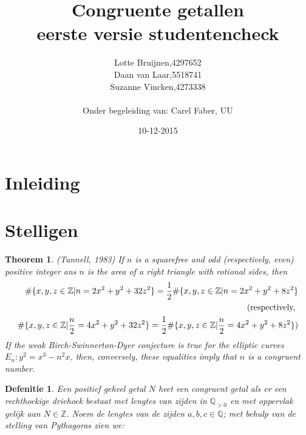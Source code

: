 \documentclass[12pt,reqno]{article}
\title{\textbf{Congruente getallen}\\
		\small{eerste versie studentencheck}}
\author{
	\begin{tabular}{ l l }
		Lotte Bruijnen, & 4297652 \\
		Daan van Laar, & 5518741 \\
		Suzanne Vincken, & 4273338
	\end{tabular}\\
	Onder begeleiding van: Carel Faber, UU
}
\date{10-12-2015}
\newcommand*{\ZZ}{\ensuremath{\mathbb{Z}}}
\newcommand*{\QQ}{\ensuremath{\mathbb{Q}}}
\begin{document}
	
	\maketitle
	\allowdisplaybreaks
	
	\section{Inleiding}
	
	\section{Stelligen}
	
	\newtheorem{Tunnell}{Theorem}
	\begin{Tunnell}
		 (Tunnell, 1983) If $n$ is a squarefree and odd (respectively, even) positive integer ans $n$ is the area of a right triangle with rotional sides, then
		\begin{align}
		\#\{x,y,z\in\ZZ|n=2x^2+y^2+32z^2\} = \frac{1}{2}\#\{x,y,z\in\ZZ|n=2x^2+y^2+8z^2\}\\
		\notag \text{(respectively, } \\
		\#\{x,y,z\in\ZZ|\frac{n}{2}=4x^2+y^2+32z^2\} = \frac{1}{2}\#\{x,y,z\in\ZZ|\frac{n}{2}=4x^2+y^2+8z^2\})
		\end{align}
		If the weak Birch-Swinnerton-Dyer conjecture is true for the elliptic curves $E_n:y^2=x^3-n^2x$, then, conversely, these equalities imply that $n$ is a congruent number.
	\end{Tunnell}
	
	\newtheorem{CG}{Defenitie}
	\begin{CG}
		Een positief geheel getal $N$ heet een congruent getal als er een rechthoekige driehoek bestaat met lengtes van zijden in $\QQ_{>0}$ en met oppervlak gelijk aan $N\in\ZZ$. Noem de lengtes van de zijden $a,b,c\in\QQ$; met behulp van de stelling van Pythagoras zien we:
		
	\end{CG}
	
	
	
	
	
\end{document}
